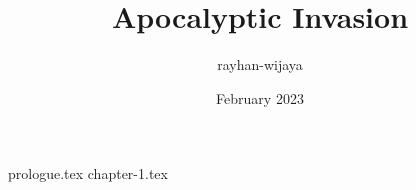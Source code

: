 \documentclass[12pt]{report}
\title{Apocalyptic Invasion}
\author{rayhan-wijaya}
\date{February 2023}
\begin{document}
\maketitle

{prologue.tex}
{chapter-1.tex}
\end{document}
